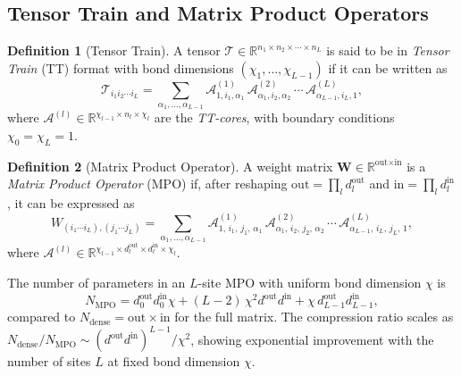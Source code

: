 \documentclass[11pt,a4paper]{article}
\newcommand{\mpomat}[1]{\mathbf{#1}}
\newcommand{\R}{\mathbb{R}}
\newcommand{\calA}{\mathcal{A}}
\theoremstyle{definition}
\newtheorem{definition}{Definition}
\begin{document}
\subsection{Tensor Train and Matrix Product Operators}

\begin{definition}[Tensor Train]
A tensor $\mathcal{T} \in \R^{n_1 \times n_2 \times \cdots \times n_L}$ is said to be in \emph{Tensor Train} (TT) format with bond dimensions $(\chi_1, \ldots, \chi_{L-1})$ if it can be written as
\begin{equation}
  \mathcal{T}_{i_1 i_2 \cdots i_L}
  = \sum_{\alpha_1, \ldots, \alpha_{L-1}}
    \calA^{(1)}_{1, i_1, \alpha_1}\,
    \calA^{(2)}_{\alpha_1, i_2, \alpha_2}\,
    \cdots\,
    \calA^{(L)}_{\alpha_{L-1}, i_L, 1},
  \label{eq:tt}
\end{equation}
where $\calA^{(l)} \in \R^{\chi_{l-1} \times n_l \times \chi_l}$ are the \emph{TT-cores}, with boundary conditions $\chi_0 = \chi_L = 1$.
\end{definition}

\begin{definition}[Matrix Product Operator]
A weight matrix $\mpomat{W} \in \R^{\text{out} \times \text{in}}$ is a \emph{Matrix Product Operator} (MPO) if, after reshaping $\text{out} = \prod_l d_l^\text{out}$ and $\text{in} = \prod_l d_l^\text{in}$, it can be expressed as
\begin{equation}
  W_{(i_1\cdots i_L),(j_1\cdots j_L)}
  = \sum_{\alpha_1,\ldots,\alpha_{L-1}}
    \calA^{(1)}_{1,\, i_1,\, j_1,\, \alpha_1}\,
    \calA^{(2)}_{\alpha_1,\, i_2,\, j_2,\, \alpha_2}\,
    \cdots\,
    \calA^{(L)}_{\alpha_{L-1},\, i_L,\, j_L,\, 1},
  \label{eq:mpo}
\end{equation}
where $\calA^{(l)} \in \R^{\chi_{l-1} \times d_l^\text{out} \times d_l^\text{in} \times \chi_l}$.
\end{definition}

The number of parameters in an $L$-site MPO with uniform bond dimension $\chi$ is
\begin{equation}
  N_\text{MPO}
  = d_0^\text{out} d_0^\text{in}\chi
  + (L-2)\,\chi^2 d^\text{out} d^\text{in}
  + \chi\, d_{L-1}^\text{out} d_{L-1}^\text{in},
  \label{eq:params}
\end{equation}
compared to $N_\text{dense} = \text{out} \times \text{in}$ for the full matrix. The compression ratio scales as $N_\text{dense}/N_\text{MPO} \sim (d^\text{out} d^\text{in})^{L-1}/\chi^2$, showing exponential improvement with the number of sites $L$ at fixed bond dimension $\chi$.
\end{document}
